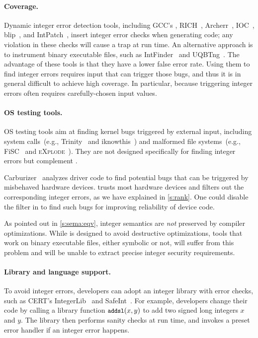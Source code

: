 \paragraph{Coverage.}
Dynamic integer error detection tools,
including
GCC's ,
RICH~\cite{brumley:rich},
Archerr~\cite{archerr},
IOC~\cite{ioc},
blip~\cite{blip},
and
IntPatch~\cite{intpatch},
insert integer error checks when generating code; any violation in
these checks will cause a trap at run time.
%
%
An alternative approach is to instrument binary executable files,
such as IntFinder~\cite{intfinder} and UQBTng~\cite{uqbtng}.
%
The advantage of these tools is that they have a lower false error rate.
Using them to find integer errors requires input that can trigger
those bugs, and thus it is in general difficult to achieve high
coverage.  In particular, because triggering integer errors often requires
carefully-chosen input values.

\paragraph{OS testing tools.}
OS testing tools aim at finding kernel bugs triggered by external input,
including system calls~(e.g., Trinity~\cite{trinity} and
iknowthis~\cite{iknowthis}) and malformed file systems~(e.g.,
FiSC~\cite{fisc:yang} and \textsc{eXplode}~\cite{explode:yang}).
They are not designed specifically for finding integer errors
but complement \sys.
\fi

Carburizer~\cite{kadav:tolerating} analyzes driver code to find
potential bugs that can be triggered by misbehaved hardware devices.
\sys trusts most hardware devices and filters out the corresponding
integer errors, as we have explained in \autoref{s:rank}.  One could
disable the filter in \sys to find such bugs for improving reliability
of device code.
\fi

As pointed out in \autoref{s:sema:eqv}, integer semantics
are \emph{not} preserved by compiler optimizations.
While \sys is designed to avoid destructive optimizations, tools that
work on binary executable files, either symbolic or not,
will suffer from this problem and will be unable to extract
precise integer security requirements.
\fi

\paragraph{Library and language support.}
To avoid integer errors, developers can adopt
an integer library with error checks, such as CERT's
IntegerLib~\cite[INT03-C]{seacord:secure-c}
and SafeInt~\cite{safeint}.
For example, developers
change their code by calling a library function $\cc{addsl}(x, y)$
to add two signed long integers $x$ and $y$.
The library then performs sanity checks at run time, and invokes a
preset error handler if an integer error happens.


